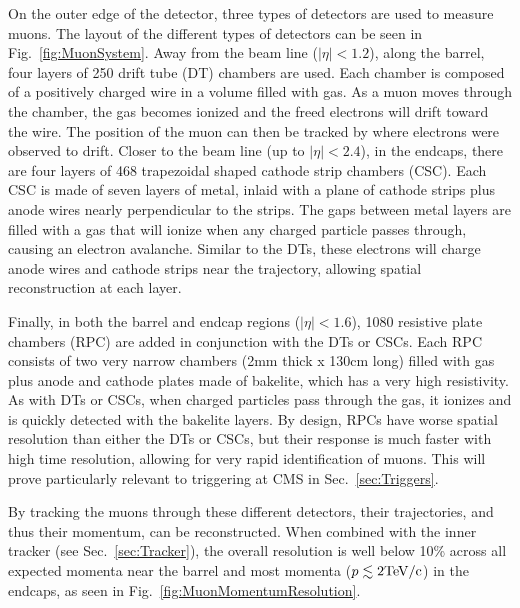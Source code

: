 On the outer edge of the detector, three types of detectors are used to measure muons. The layout of the different types of detectors can be seen in Fig.~\ref{fig:MuonSystem}. Away from the beam line ($|\eta|<1.2$), along the barrel, four layers of 250 drift tube (DT) chambers are used. Each chamber is composed of a positively charged wire in a volume filled with gas. As a muon moves through the chamber, the gas becomes ionized and the freed electrons will drift toward the wire. The position of the muon can then be tracked by where electrons were observed to drift. Closer to the beam line (up to $|\eta|<2.4$), in the endcaps, there are four layers of 468 trapezoidal shaped cathode strip chambers (CSC). Each CSC is made of seven layers of metal, inlaid with a plane of cathode strips plus anode wires nearly perpendicular to the strips. The gaps between metal layers are filled with a gas that will ionize when any charged particle passes through, causing an electron avalanche. Similar to the DTs, these electrons will charge anode wires and cathode strips near the trajectory, allowing spatial reconstruction at each layer.

Finally, in both the barrel and endcap regions ($|\eta|<1.6$), 1080 resistive plate chambers (RPC) are added in conjunction with the DTs or CSCs. Each RPC consists of two very narrow chambers (2mm thick x 130cm long) filled with gas plus anode and cathode plates made of bakelite, which has a very high resistivity. As with DTs or CSCs, when charged particles pass through the gas, it ionizes and is quickly detected with the bakelite layers. By design, RPCs have worse spatial resolution than either the DTs or CSCs, but their response is much faster with high time resolution, allowing for very rapid identification of muons. This will prove particularly relevant to triggering at CMS in Sec.~\ref{sec:Triggers}.

By tracking the muons through these different detectors, their trajectories, and thus their momentum, can be reconstructed. When combined with the inner tracker (see Sec.~\ref{sec:Tracker}), the overall resolution is well below 10\% across all expected momenta near the barrel and most momenta ($p \lesssim 2 \rm{TeV}/c$) in the endcaps, as seen in Fig.~\ref{fig:MuonMomentumResolution}.

